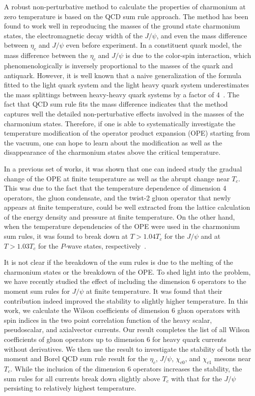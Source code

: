 \documentclass[aps,prc,superscriptaddress,showpacs,floatfix, nofootinbib,preprintnumbers,twocolumn]{revtex4}
\begin{document}
A robust non-perturbative method to calculate the properties of charmonium at zero temperature is based on the QCD sum rule approach\cite{Shifman:1978bx,Reinders:1984sr}.  The method has been found to work well in reproducing the masses of the ground state charmonium states, the electromagnetic decay width of the $J/\psi$, and even the mass difference between $\eta_c$ and $J/\psi$ even before experiment.  In a constituent quark model, the mass difference between the $\eta_c$ and $J/\psi$ is due to the color-spin interaction, which phenomenologically is inversely proportional to the masses of the quark and antiquark.  However, it is well known that a naive generalization of the formula fitted to the light quark system and the light heavy quark system underestimates the mass splittings between heavy-heavy quark systems by a factor of 4~\cite{Lee:2007tn}.  The fact that QCD sum rule fits the mass difference indicates that the method captures well the detailed non-perturbative effects involved in the masses of the charmonium states. 
Therefore, if one is able to systematically investigate the temperature modification of the operator product expansion (OPE) starting from the vacuum, one can hope to learn about the modification as well as the disappearance of the charmonium states above the critical temperature.  

In a previous set of works\cite{Morita:2007pt,Morita:2007hv,Morita:2009qk}, it was shown that one can indeed study the gradual change of the OPE at finite temperature as well as the abrupt change near $T_c$.  This was due to the fact that the temperature dependence of dimension 4 operators, the gluon condensate, and the twist-2 gluon operator that newly appears at finite temperature, could be well extracted from the lattice calculation of the energy density and pressure at finite temperature.  
On the other hand, when the temperature dependencies of the OPE were used in the charmonium sum rules, it was found to break down at $T>1.04 T_c$ for the $J/\psi$ and at $T>1.03T_c$ for the $P$-wave states, respectively~\cite{Song:2008bd}.   

It is not clear if the breakdown of the sum rules is due to the melting of the charmonium states or the breakdown of the OPE. To shed light into the problem,  
we have recently studied the effect of including the dimension 6 operators to the moment sum rules for $J/\psi$ at finite temperature.  It was found that their contribution indeed improved the stability to slightly higher temperature\cite{Kim:2015xna}.  In this work, we calculate the Wilson coefficients of dimension 6 gluon operators with spin indices in the two point correlation function of the heavy scalar, pseudoscalar, and axialvector currents. Our result completes the list of all Wilson coefficients of gluon operators up to dimension 6 for heavy quark currents without derivatives. 
We then use the result to investigate the stability of both the moment and Borel QCD sum rule result for the  $\eta_c$, $J/\psi$, $\chi_{c0}$, and $\chi_{c1}$ mesons near $T_c$.
While the inclusion of the dimension 6 operators increases the stability, the sum rules for all currents break down slightly above $T_c$  with that for the $J/\psi$ persisting to relatively highest temperature.  
\end{document}
